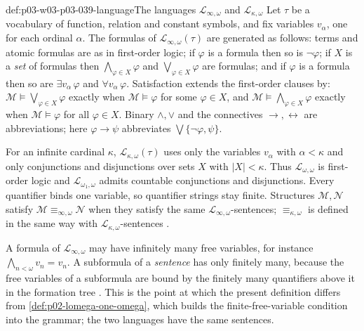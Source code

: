\begin{hbdefinition}{def:p03-w03-p03-039-language}{The languages \(\mathcal L_{\infty,\omega}\) and \(\mathcal L_{\kappa,\omega}\)}
Let \(\tau\) be a vocabulary of function, relation and constant symbols, and
fix variables \(v_\alpha\), one for each ordinal \(\alpha\). The formulas of
\(\mathcal L_{\infty,\omega}(\tau)\) are generated as follows: terms and
atomic formulas are as in first-order logic; if \(\varphi\) is a formula then
so is \(\neg\varphi\); if \(X\) is a \emph{set} of formulas then
\(\bigwedge_{\varphi\in X}\varphi\) and \(\bigvee_{\varphi\in X}\varphi\) are
formulas; and if \(\varphi\) is a formula then so are \(\exists v_\alpha\,\varphi\)
and \(\forall v_\alpha\,\varphi\). Satisfaction extends the first-order clauses
by: \(\mathcal M\models\bigvee_{\varphi\in X}\varphi\) exactly when
\(\mathcal M\models\varphi\) for some \(\varphi\in X\), and
\(\mathcal M\models\bigwedge_{\varphi\in X}\varphi\) exactly when
\(\mathcal M\models\varphi\) for all \(\varphi\in X\). Binary \(\land,\lor\)
and the connectives \(\to,\leftrightarrow\) are abbreviations; here
\(\varphi\to\psi\) abbreviates \(\bigvee\{\neg\varphi,\psi\}\).

For an infinite cardinal \(\kappa\), \(\mathcal L_{\kappa,\omega}(\tau)\) uses
only the variables \(v_\alpha\) with \(\alpha<\kappa\) and only conjunctions
and disjunctions over sets \(X\) with \(\lvert X\rvert<\kappa\). Thus
\(\mathcal L_{\omega,\omega}\) is first-order logic and
\(\mathcal L_{\omega_1,\omega}\) admits countable conjunctions and
disjunctions. Every quantifier binds one variable, so quantifier strings stay
finite. Structures \(\mathcal M,\mathcal N\) satisfy
\(\mathcal M\equiv_{\infty,\omega}\mathcal N\) when they satisfy the same
\(\mathcal L_{\infty,\omega}\)-sentences; \(\equiv_{\kappa,\omega}\) is
defined in the same way with \(\mathcal L_{\kappa,\omega}\)-sentences
\cite[pp.~4--5, Def.~1.3]{Marker2014InfinitaryNotes}.
\end{hbdefinition}

A formula of \(\mathcal L_{\infty,\omega}\) may have infinitely many free
variables, for instance \(\bigwedge_{n<\omega}v_n=v_n\). A subformula of a
\emph{sentence} has only finitely many, because the free variables of a
subformula are bound by the finitely many quantifiers above it in the
formation tree
\cite[Ex.~1.1, p.~5]{Marker2014InfinitaryNotes}. This is the point at which
the present definition differs from \cref{def:p02-lomega-one-omega}, which
builds the finite-free-variable condition into the grammar; the two languages
have the same sentences.

